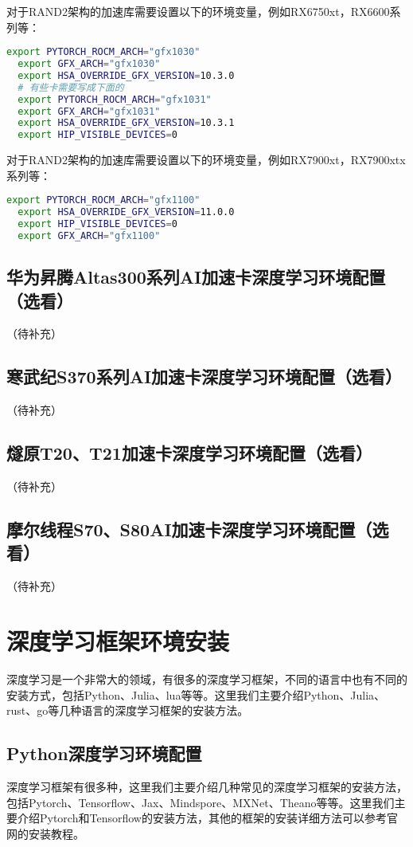 \documentclass[lang=cn,a4paper,newtx]{elegantpaper}
\begin{document}
对于RAND2架构的加速库需要设置以下的环境变量，例如RX6750xt，RX6600系列等：
\begin{lstlisting}[language=bash]
  export PYTORCH_ROCM_ARCH="gfx1030"
  export GFX_ARCH="gfx1030"
  export HSA_OVERRIDE_GFX_VERSION=10.3.0
  # 有些卡需要写成下面的
  export PYTORCH_ROCM_ARCH="gfx1031"
  export GFX_ARCH="gfx1031"
  export HSA_OVERRIDE_GFX_VERSION=10.3.1
  export HIP_VISIBLE_DEVICES=0
\end{lstlisting}

对于RAND2架构的加速库需要设置以下的环境变量，例如RX7900xt，RX7900xtx系列等：
\begin{lstlisting}[language=bash]
  export PYTORCH_ROCM_ARCH="gfx1100"
  export HSA_OVERRIDE_GFX_VERSION=11.0.0
  export HIP_VISIBLE_DEVICES=0
  export GFX_ARCH="gfx1100"
\end{lstlisting}


\subsection{华为昇腾Altas300系列AI加速卡深度学习环境配置（选看）}
（待补充）
\subsection{寒武纪S370系列AI加速卡深度学习环境配置（选看）}
（待补充）
\subsection{燧原T20、T21加速卡深度学习环境配置（选看）}
（待补充）
\subsection{摩尔线程S70、S80AI加速卡深度学习环境配置（选看）}
（待补充）
\section{深度学习框架环境安装}
深度学习是一个非常大的领域，有很多的深度学习框架，不同的语言中也有不同的安装方式，包括Python、Julia、lua等等。这里我们主要介绍Python、Julia、rust、go等几种语言的深度学习框架的安装方法。
\subsection{Python深度学习环境配置}
深度学习框架有很多种，这里我们主要介绍几种常见的深度学习框架的安装方法，包括Pytorch、Tensorflow、Jax、Mindspore、MXNet、Theano等等。这里我们主要介绍Pytorch和Tensorflow的安装方法，其他的框架的安装详细方法可以参考官网的安装教程。
\end{document}
